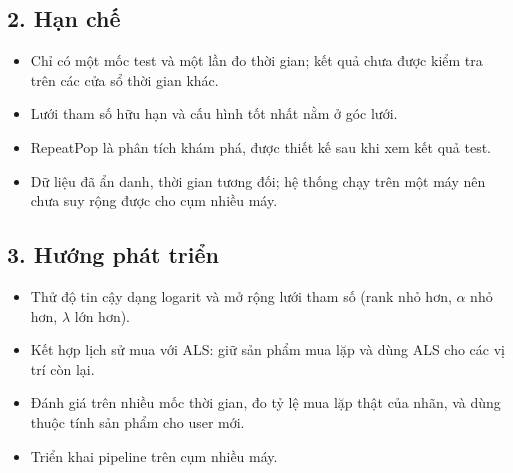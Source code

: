 \documentclass[a4paper,12pt,oneside]{report}
\begin{document}
\subsection*{2. Hạn chế}
\begin{itemize}
  \item Chỉ có một mốc test và một lần đo thời gian; kết quả chưa được kiểm tra trên các cửa sổ thời gian khác.
  \item Lưới tham số hữu hạn và cấu hình tốt nhất nằm ở góc lưới.
  \item RepeatPop là phân tích khám phá, được thiết kế sau khi xem kết quả test.
  \item Dữ liệu đã ẩn danh, thời gian tương đối; hệ thống chạy trên một máy nên chưa suy rộng được cho cụm nhiều máy.
\end{itemize}

\subsection*{3. Hướng phát triển}
\begin{itemize}
  \item Thử độ tin cậy dạng logarit và mở rộng lưới tham số (rank nhỏ hơn, $\alpha$ nhỏ hơn, $\lambda$ lớn hơn).
  \item Kết hợp lịch sử mua với ALS: giữ sản phẩm mua lặp và dùng ALS cho các vị trí còn lại.
  \item Đánh giá trên nhiều mốc thời gian, đo tỷ lệ mua lặp thật của nhãn, và dùng thuộc tính sản phẩm cho user mới.
  \item Triển khai pipeline trên cụm nhiều máy.
\end{itemize}
\end{document}
